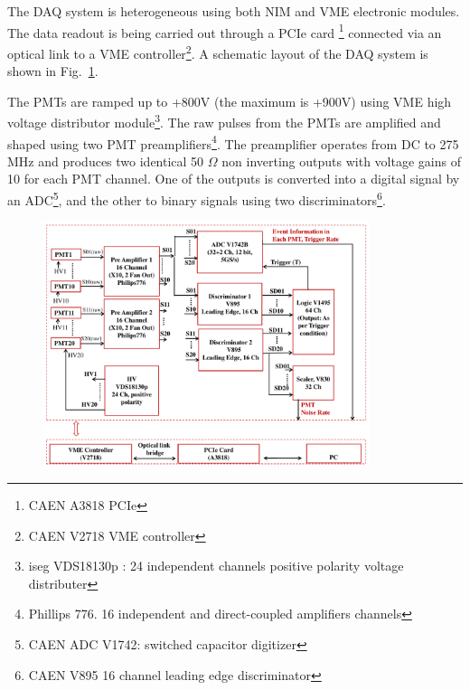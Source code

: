

The DAQ system is heterogeneous using both 
NIM and VME electronic modules. The data readout is being carried out through a PCIe card \footnote{CAEN A3818 PCIe}  connected via an optical link to a VME controller\footnote{CAEN V2718 VME controller}. A schematic layout of the DAQ system is shown in Fig.~{\ref{Fig:DAQscheme}}. 

The PMTs are ramped up to +800V (the maximum is +900V) using VME high voltage distributor module\footnote{iseg VDS18130p : 
24 independent channels positive polarity voltage distributer}. The raw pulses from the PMTs are amplified and shaped using 
two PMT preamplifiers\footnote{Phillips 776. 16 independent and direct-coupled amplifiers channels}. The preamplifier operates 
from DC to 275 MHz and produces two identical 50 $\Omega$ non inverting outputs with voltage gains of 10 for each PMT channel. One 
of the outputs is converted into a digital signal by an ADC\footnote{CAEN ADC V1742: switched capacitor digitizer}, and the other to 
binary signals using two discriminators\footnote{CAEN V895 16 channel leading edge discriminator}.

\begin{figure}[h]
   \centering
   \includegraphics[width=0.85\textwidth]{fig/DAQscheme.pdf}
   \label{Fig:DAQscheme}
\end{figure}


